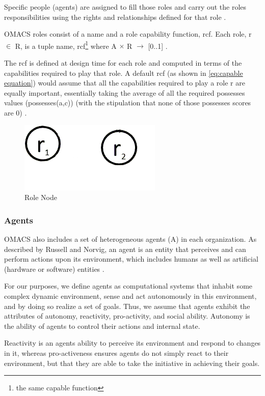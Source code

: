 Specific people (agents) are assigned to fill those roles and carry out the roles responsibilities using the rights and
relationships defined for that role \cite{omacs2}.

OMACS roles consist of a name and a role capability function, rcf. Each role, r $\in$ R, is a tuple
\textlangle{} name, rcf\footnote{the same capable function} \textrangle{}  where A $\times$ R $\rightarrow$ {[}0..1{]} .


The rcf is defined at design time for each role and computed in terms of 
the capabilities required to play that role.
A default rcf (as shown in \ref{eq:capable equation}) 
would assume that all the capabilities required to play a role r are equally important,
essentially taking the average of all the required possesses values (possesses(a,c))
(with the stipulation that none of those possesses scores are 0) \cite{omacs4}.
\hspace{1.5cm}
\begin{figure}[th]
	\centering
		\includegraphics[scale=0.5]{ch1/img/roles}
	\caption{\label{fig:Role Node}Role Node}
\end{figure}
\hspace{1cm}
\subsubsection{Agents}

OMACS also includes a set of heterogeneous agents (A) in each organization. 
As described by Russell and Norvig, an agent is an entity that perceives and can perform actions upon its
environment, which includes humans as well as artificial (hardware or software) entities \cite{omacs2}.

For our purposes, we define agents as computational systems that inhabit some complex dynamic
environment, sense and act autonomously in this environment, and by doing so realize a set of
goals. Thus, we assume that agents exhibit the attributes of autonomy, reactivity, pro-activity, and
social ability. Autonomy is the ability of agents to control their actions and internal state.


Reactivity is an agents ability to perceive its environment and respond to changes in it, whereas
pro-activeness ensures agents do not simply react to their environment, but that they are able to
take the initiative in achieving their goals. 


